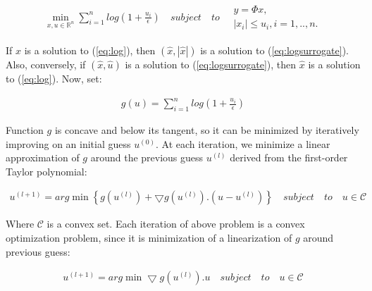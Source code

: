 \begin{equation}
\label{eq:logsurrogate}
\begin{gathered}
\min_{x,u\in \mathbb{R}^{n}} 
\sum_{i=1}^{n} log(1+\frac{u_{i}}{\epsilon })
\quad subject \quad to \quad \begin{matrix}
y=\Phi x,\\
\left | x_{i} \right | \leq u_{i}, i=1,..,n. 
\end{matrix}
\end{gathered}
\end{equation}

If $\hat{x}$ is a solution to (\ref{eq:log}), then $(\hat{x},\left | \hat{x}  \right |)$ is a solution to (\ref{eq:logsurrogate}). Also, conversely, if $(\hat{x},\hat{u})$ is a solution to (\ref{eq:logsurrogate}), then $\hat{x}$ is a solution to (\ref{eq:log}). Now, set:

\begin{equation}
\label{eq:funcg}
\begin{gathered}
g\left ( u \right ) =
\sum_{i=1}^{n} log(1+\frac{u_{i}}{\epsilon })
\end{gathered}
\end{equation}

Function $g$ is concave and below its tangent, so it can be minimized by iteratively improving on an initial guess $u^{\left ( 0 \right )}$.
At each iteration, we minimize a linear approximation of $g$ around the previous guess $u^{\left ( l \right )}$ derived from the first-order Taylor polynomial:

\begin{equation}
\begin{gathered}
u^{\left ( l+1 \right )} = arg \min\left \{ g\left ( u^{\left ( l \right )} \right ) + \bigtriangledown g\left ( u^{\left ( l \right )} \right ).\left ( u-u^{\left ( l \right )} \right ) \right \} 
\quad subject \quad to \quad u\in \mathcal{C}
\end{gathered}
\end{equation}

Where $\mathcal{C}$ is a convex set. Each iteration of above problem is a convex optimization problem, since it is minimization of a linearization of $g$ around previous guess:

\begin{equation}
\begin{gathered}
u^{\left ( l+1 \right )} = arg \min \bigtriangledown g\left ( u^{\left ( l \right )} \right ).u
\quad subject \quad to \quad u\in \mathcal{C}
\end{gathered}
\end{equation}

